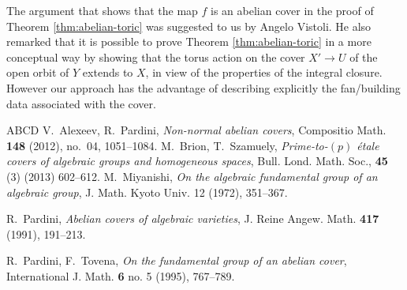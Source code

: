 \documentclass[10pt]{amsart}
\numberwithin{equation}{section}
\begin{document}
\begin{remark}\label{rem:angelo}
The argument that shows that the map $f$   is an abelian cover  in the proof of Theorem \ref{thm:abelian-toric} was suggested  to us by  Angelo Vistoli. He also remarked  that it is possible to prove  Theorem \ref{thm:abelian-toric} in a more conceptual way by showing that the torus action on the  cover  $X'\to U$ of the open orbit of $Y$ extends to $X$, in view of the properties of the integral closure. However our approach has the advantage of describing explicitly the fan/building data associated with the cover.
\end{remark}


\begin{thebibliography}{ABCD}
 V.~Alexeev,  R.~Pardini,
  \emph{Non-normal abelian covers}, Compositio Math. \textbf{148}
  (2012), no.~04, 1051--1084.
   M.~Brion, T.~Szamuely, {\em Prime-to-$(p)$ {\'e}tale covers of algebraic groups and homogeneous spaces},
 Bull. Lond. Math. Soc., {\bf 45} (3) (2013) 602--612. 
 M.~Miyanishi, {\em On the algebraic fundamental group of an algebraic group}, J. 
Math. Kyoto Univ. 12 (1972), 351--367. 

 R.~Pardini, \emph{{A}belian
    covers of algebraic varieties}, J. Reine Angew.
  Math. \textbf{417} (1991), 191--213. 
  
  R.~Pardini, F.~Tovena, {\em On the fundamental group of an abelian cover},   International  J.  Math.  {\bf 6} no. 5 (1995), 767--789. 

\end{thebibliography}
\end{document}
